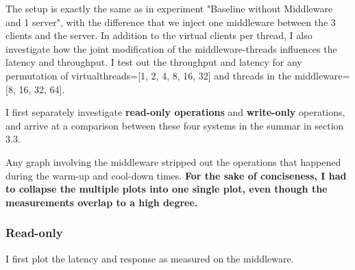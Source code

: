 \documentclass[11pt,a4paper]{article}
\begin{document}
The setup is exactly the same as in experiment "Baseline without Middleware and 1 server", with the difference that we inject one middleware between the 3 clients and the server.
In addition to the virtual clients per thread, I also investigate how the joint modification of the middleware-threads influences the latency and throughput.
I test out the throughput and latency for any permutation of
virtualthreads=[1, 2, 4, 8, 16, 32] and threads in the middleware=[8, 16, 32, 64].

I first separately investigate \textbf{read-only operations} and \textbf{write-only} operations, and arrive at a comparison between these four systems in the summar in section 3.3.

Any graph involving the middleware stripped out the operations that happened during the warm-up and cool-down times.
\textbf{For the sake of conciseness, I had to collapse the multiple plots into one single plot, even though the measurements overlap to a high degree.}

\subsubsection{Read-only}

I first plot the latency and response as measured on the middleware.
\end{document}
